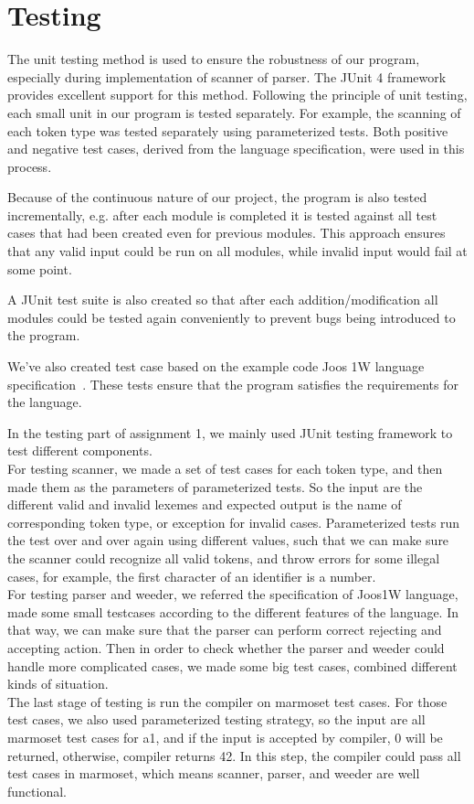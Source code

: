 \chapter{Testing}

The unit testing method is used to ensure the robustness of our program, especially during implementation of scanner of parser. The JUnit 4 framework provides excellent support for this method. Following the principle of unit testing, each small unit in our program is tested separately. For example, the scanning of each token type was tested separately using parameterized tests. Both positive and negative test cases, derived from the language specification, were used in this process. 

Because of the continuous nature of our project, the program is also tested incrementally, e.g. after each module is completed it is tested against all test cases that had been created even for previous modules. This approach ensures that any valid input could be run on all modules, while invalid input would fail at some point.

A JUnit test suite is also created so that after each addition/modification all modules could be tested again conveniently to prevent bugs being introduced to the program.

We've also created test case based on the example code Joos 1W language specification~\cite{joos1w}. These tests ensure that the program satisfies the requirements for the language.

In the testing part of assignment 1, we mainly used JUnit testing framework to test different components. \\
For testing scanner, we made a set of test cases for each token type, and then made them as the parameters of parameterized tests. So the input are the different valid and invalid lexemes and expected output is the name of corresponding token type, or exception for invalid cases. Parameterized tests run the test over and over again using different values, such that we can make sure the scanner could recognize all valid tokens, and throw errors for some illegal cases, for example, the first character of an identifier is a number.\\
For testing parser and weeder, we referred the specification of Joos1W language, made some small testcases according to the different features of the language. In that way, we can make sure that the parser can perform correct rejecting and accepting action. Then in order to check whether the parser and weeder could handle more complicated cases, we made some big test cases, combined different kinds of situation.\\
The last stage of testing is run the compiler on marmoset test cases. For those test cases, we also used parameterized testing strategy, so the input are all marmoset test cases for a1, and if the input is accepted by compiler, 0 will be returned, otherwise, compiler returns 42. In this step, the compiler could pass all test cases in marmoset, which means scanner, parser, and weeder are well functional.  



